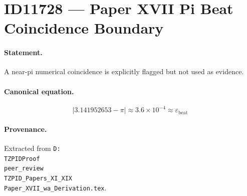 \section*{ID11728 --- Paper XVII Pi Beat Coincidence Boundary}

\paragraph{Statement.}
A near-pi numerical coincidence is explicitly flagged but not used as evidence.

\paragraph{Canonical equation.}
\[
|3.141952653-\pi|\approx3.6\times10^{-4}\approx\varepsilon_{\mathrm{beat}}
\]

\paragraph{Provenance.}
Extracted from \texttt{D:\\TZPIDProof\\peer\_review\\TZPID\_Papers\_XI\_XIX\\Paper\_XVII\_wa\_Derivation.tex}.
